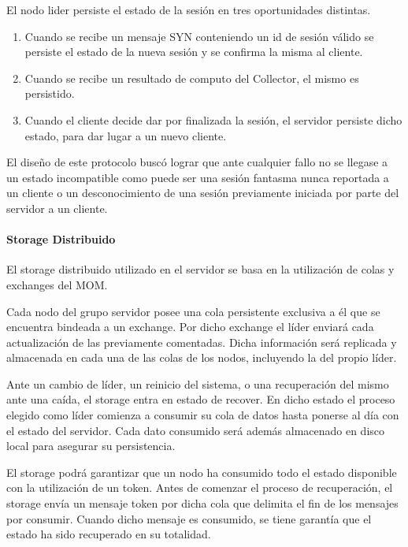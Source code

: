 \documentclass[titlepage,a4paper,oneside]{article}
\begin{document}
El nodo lider persiste el estado de la sesión en tres oportunidades distintas.

\begin{enumerate}
    \item Cuando se recibe un mensaje SYN conteniendo un id de sesión válido se persiste el estado de la nueva sesión y se confirma la misma al cliente.
    \item Cuando se recibe un resultado de computo del Collector, el mismo es persistido.
    \item Cuando el cliente decide dar por finalizada la sesión, el servidor persiste dicho estado, para dar lugar a un nuevo cliente.
\end{enumerate}

El diseño de este protocolo buscó lograr que ante cualquier fallo no se llegase a un estado incompatible como puede ser una sesión fantasma nunca reportada a un cliente o un desconocimiento de una sesión previamente iniciada por parte del servidor a un cliente.

\paragraph{Storage Distribuido}

El storage distribuido utilizado en el servidor se basa en la utilización de colas y exchanges del MOM.

Cada nodo del grupo servidor posee una cola persistente exclusiva a él que se encuentra bindeada a un exchange. Por dicho exchange el líder enviará cada actualización de las previamente comentadas. Dicha información será replicada y almacenada en cada una de las colas de los nodos, incluyendo la del propio líder.

Ante un cambio de líder, un reinicio del sistema, o una recuperación del mismo ante una caída, el storage entra en estado de recover. En dicho estado el proceso elegido como líder comienza a consumir su cola de datos hasta ponerse al día con el estado del servidor. Cada dato consumido será además almacenado en disco local para asegurar su persistencia.

El storage podrá garantizar que un nodo ha consumido todo el estado disponible con la utilización de un token. Antes de comenzar el proceso de recuperación, el storage envía un mensaje token por dicha cola que delimita el fin de los mensajes por consumir. Cuando dicho mensaje es consumido, se tiene garantía que el estado ha sido recuperado en su totalidad.
\end{document}
